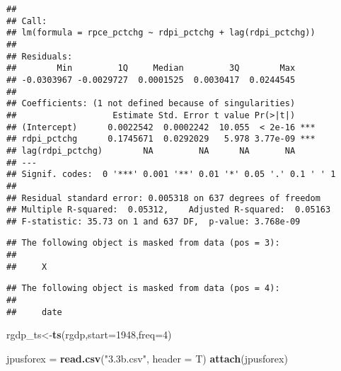 \documentclass[]{article}
\newenvironment{Shaded}{\begin{snugshade}}{\end{snugshade}}
\newcommand{\KeywordTok}[1]{\textcolor[rgb]{0.13,0.29,0.53}{\textbf{#1}}}
\newcommand{\DataTypeTok}[1]{\textcolor[rgb]{0.13,0.29,0.53}{#1}}
\newcommand{\DecValTok}[1]{\textcolor[rgb]{0.00,0.00,0.81}{#1}}
\newcommand{\StringTok}[1]{\textcolor[rgb]{0.31,0.60,0.02}{#1}}
\newcommand{\CommentTok}[1]{\textcolor[rgb]{0.56,0.35,0.01}{\textit{#1}}}
\newcommand{\OtherTok}[1]{\textcolor[rgb]{0.56,0.35,0.01}{#1}}
\newcommand{\NormalTok}[1]{#1}
\begin{document}
\begin{verbatim}
## 
## Call:
## lm(formula = rpce_pctchg ~ rdpi_pctchg + lag(rdpi_pctchg))
## 
## Residuals:
##        Min         1Q     Median         3Q        Max 
## -0.0303967 -0.0029727  0.0001525  0.0030417  0.0244545 
## 
## Coefficients: (1 not defined because of singularities)
##                   Estimate Std. Error t value Pr(>|t|)    
## (Intercept)      0.0022542  0.0002242  10.055  < 2e-16 ***
## rdpi_pctchg      0.1745671  0.0292029   5.978 3.77e-09 ***
## lag(rdpi_pctchg)        NA         NA      NA       NA    
## ---
## Signif. codes:  0 '***' 0.001 '**' 0.01 '*' 0.05 '.' 0.1 ' ' 1
## 
## Residual standard error: 0.005318 on 637 degrees of freedom
## Multiple R-squared:  0.05312,    Adjusted R-squared:  0.05163 
## F-statistic: 35.73 on 1 and 637 DF,  p-value: 3.768e-09
\end{verbatim}

\begin{Shaded}
\end{Shaded}

\begin{verbatim}
## The following object is masked from data (pos = 3):
## 
##     X
\end{verbatim}

\begin{verbatim}
## The following object is masked from data (pos = 4):
## 
##     date
\end{verbatim}

\begin{Shaded}
\begin{Highlighting}[]
\NormalTok{rgdp_ts<-}\KeywordTok{ts}\NormalTok{(rgdp,}\DataTypeTok{start=}\DecValTok{1948}\NormalTok{,}\DataTypeTok{freq=}\DecValTok{4}\NormalTok{)}

\NormalTok{jpusforex =}\StringTok{ }\KeywordTok{read.csv}\NormalTok{(}\StringTok{"3.3b.csv"}\NormalTok{, }\DataTypeTok{header =}\NormalTok{ T)}
\KeywordTok{attach}\NormalTok{(jpusforex)}
\end{Highlighting}
\end{Shaded}
\end{document}
